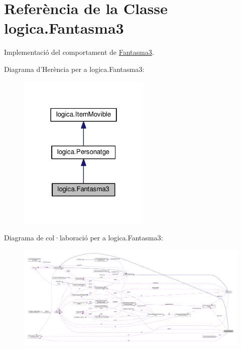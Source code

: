 \hypertarget{classlogica_1_1_fantasma3}{\section{Referència de la Classe logica.\+Fantasma3}
\label{classlogica_1_1_fantasma3}
}


Implementació del comportament de \hyperlink{classlogica_1_1_fantasma3}{Fantasma3}.  




Diagrama d'Herència per a logica.\+Fantasma3\+:
\nopagebreak
\begin{figure}[H]
\begin{center}
\leavevmode
\includegraphics[width=178pt]{classlogica_1_1_fantasma3__inherit__graph}
\end{center}
\end{figure}


Diagrama de col·laboració per a logica.\+Fantasma3\+:
\nopagebreak
\begin{figure}[H]
\begin{center}
\leavevmode
\includegraphics[width=350pt]{classlogica_1_1_fantasma3__coll__graph}
\end{center}
\end{figure}
